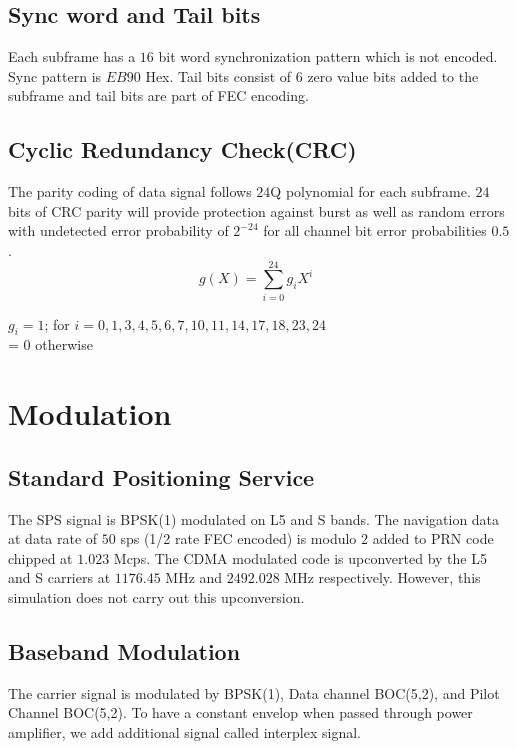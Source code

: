 \subsection{Sync word and Tail bits}
Each subframe has a $16$ bit word synchronization pattern which is not encoded. Sync pattern is $EB90$ Hex. Tail bits consist of $6$ zero value bits added to the subframe and tail bits are part of FEC encoding. 

\subsection{Cyclic Redundancy Check(CRC)}
The parity coding of data signal follows $24$Q polynomial for each subframe. $24$ bits of CRC parity will provide protection against burst as well as random errors with undetected error probability of $2^{-24}$ for all channel bit error probabilities $0.5$.
\begin{equation}
    g(X) = \sum_{i = 0}^{24}g_{i}X^i\;\; 
\end{equation}

    $g_{i}=1$; for $i = 0,1,3,4,5,6,7,10,11,14,17,18,23,24$ \\
          = 0 otherwise

\section{Modulation}

\subsection{Standard Positioning Service}
The SPS signal is BPSK(1) modulated on L5 and S bands. The navigation data at data rate of $50$ sps (1/2 rate FEC encoded) is modulo $2$ added to PRN code chipped at $1.023$ Mcps. The CDMA modulated code is upconverted by the L5 and S carriers at $1176.45$ MHz and $2492.028$ MHz respectively. However, this simulation does not carry out this upconversion.

\subsection{Baseband Modulation}
The carrier signal is modulated by BPSK(1), Data channel BOC(5,2), and Pilot Channel BOC(5,2). To have a constant envelop when passed through power amplifier, we add additional signal called interplex signal.

